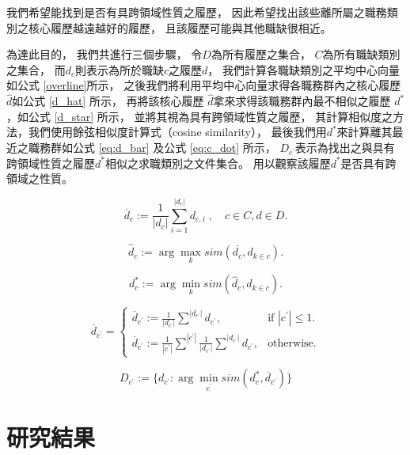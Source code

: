 \documentclass[sigconf]{acmart}
\begin{document}
我們希望能找到是否有具跨領域性質之履歷，
因此希望找出該些離所屬之職務類別之核心履歷越遠越好的履歷，
且該履歷可能與其他職缺很相近。

為達此目的，
我們共進行三個步驟，
令$D$為所有履歷之集合，
$C$為所有職缺類別之集合，
而$d_{c}$則表示為所於職缺$c$之履歷$d$，
我們計算各職缺類別之平均中心向量如公式 \ref{overline}所示，
之後我們將利用平均中心向量求得各職務群內之核心履歷$\hat{d}$如公式 \ref{d_hat} 所示，
再將該核心履歷 $\hat{d}$拿來求得該職務群內最不相似之履歷 $d^{*}$，如公式 \ref{d_star} 所示，
並將其視為具有跨領域性質之履歷，
其計算相似度之方法，我們使用餘弦相似度計算式（cosine similarity）\cite{schutze2008introduction}，
最後我們用$d^{*}$來計算離其最近之職務群如公式 \ref{eq:d_bar} 及公式 \ref{eq:c_dot} 所示，
$D_{c^{'}}$表示為找出之與具有跨領域性質之履歷$d^{*}$相似之求職類別之文件集合。
用以觀察該履歷$d^{*}$是否具有跨領域之性質。

\begin{equation}
    \label{overline}
    \overline{d}_c := \frac{1}{|d_{c}|}\sum_{i=1}^{|d_{c}|}{d_{c,i}}\;, \quad c\in C, d\in D.
\end{equation}

\begin{equation}
    \label{d_hat}
    \hat{d}_c := \arg \max_{k} sim(\overline{d_{c}}, d_{k \in c}).
\end{equation}

\begin{equation}
    \label{d_star}
    d^{*}_c := \arg \min_{k} sim(\hat{d}_c, d_{k \in c}).
\end{equation}

\begin{equation}
    \label{eq:d_bar}
    \overline{d}_{c^{'}}=\begin{cases}
    \overline{d}_{c^{'}} := \frac{1}{|d_{c^{'}}|}\sum \limits_{}^{|d_{c^{'}}|}{d_{c^{'}}}, & \text{if $|c^{'}| \leq 1$}.\\
    \overline{d}_{c^{'}} := \frac{1}{|c^{'}|} \sum \limits_{}^{|c^{'}|} \frac{1}{|d_{c^{'}}|}\sum \limits_{}^{|d_{c^{'}}|}{d_{c^{'}}}, & \text{otherwise}.
  \end{cases}
\end{equation}

\begin{equation}
    \label{eq:c_dot}
    D_{c^{'}} := \{ d_{c^{'}}  : \arg \min_{c^{'}} sim(d^{*}_{c}, \overline{d}_{c^{'}}) \}
\end{equation}


\section{研究結果}
\end{document}
